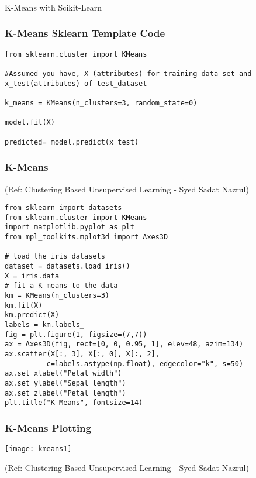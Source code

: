 \begin{frame}[fragile]\frametitle{}
\begin{center}
{\Large K-Means with Scikit-Learn}
\end{center}
\end{frame}



\begin{frame}[fragile]\frametitle{K-Means Sklearn Template Code}
\begin{lstlisting}
from sklearn.cluster import KMeans 

#Assumed you have, X (attributes) for training data set and x_test(attributes) of test_dataset 

k_means = KMeans(n_clusters=3, random_state=0) 

model.fit(X) 

predicted= model.predict(x_test) 
\end{lstlisting}
\end{frame}

\begin{frame}[fragile]\frametitle{K-Means}

{\tiny (Ref: Clustering Based Unsupervised Learning - Syed Sadat Nazrul)}

\begin{lstlisting}
from sklearn import datasets
from sklearn.cluster import KMeans
import matplotlib.pyplot as plt
from mpl_toolkits.mplot3d import Axes3D

# load the iris datasets
dataset = datasets.load_iris()
X = iris.data
# fit a K-means to the data
km = KMeans(n_clusters=3)
km.fit(X)
km.predict(X)
labels = km.labels_
fig = plt.figure(1, figsize=(7,7))
ax = Axes3D(fig, rect=[0, 0, 0.95, 1], elev=48, azim=134)
ax.scatter(X[:, 3], X[:, 0], X[:, 2],
          c=labels.astype(np.float), edgecolor="k", s=50)
ax.set_xlabel("Petal width")
ax.set_ylabel("Sepal length")
ax.set_zlabel("Petal length")
plt.title("K Means", fontsize=14)
\end{lstlisting}


\end{frame}

\begin{frame}[fragile]\frametitle{K-Means Plotting}
\begin{center}
\texttt{[image: kmeans1]}
\end{center}

{\tiny (Ref: Clustering Based Unsupervised Learning - Syed Sadat Nazrul)}

\end{frame}


